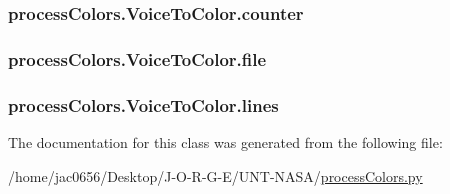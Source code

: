 \subsubsection[{\texorpdfstring{counter}{counter}}]{\setlength{\rightskip}{0pt plus 5cm}process\+Colors.\+Voice\+To\+Color.\+counter}\hypertarget{classprocessColors_1_1VoiceToColor_abe1c0c0f2e7754f4e3d8995a16feea1a}{}\label{classprocessColors_1_1VoiceToColor_abe1c0c0f2e7754f4e3d8995a16feea1a}
\subsubsection[{\texorpdfstring{file}{file}}]{\setlength{\rightskip}{0pt plus 5cm}process\+Colors.\+Voice\+To\+Color.\+file}\hypertarget{classprocessColors_1_1VoiceToColor_a09fae3fac63c4ad02c417c20301efd2b}{}\label{classprocessColors_1_1VoiceToColor_a09fae3fac63c4ad02c417c20301efd2b}
\subsubsection[{\texorpdfstring{lines}{lines}}]{\setlength{\rightskip}{0pt plus 5cm}process\+Colors.\+Voice\+To\+Color.\+lines}\hypertarget{classprocessColors_1_1VoiceToColor_a80502bad87c17548da07d9d4e7960fff}{}\label{classprocessColors_1_1VoiceToColor_a80502bad87c17548da07d9d4e7960fff}


The documentation for this class was generated from the following file\+:\begin{DoxyCompactItemize}
\item 
/home/jac0656/\+Desktop/\+J-\/\+O-\/\+R-\/\+G-\/\+E/\+U\+N\+T-\/\+N\+A\+S\+A/\hyperlink{processColors_8py}{process\+Colors.\+py}\end{DoxyCompactItemize}
